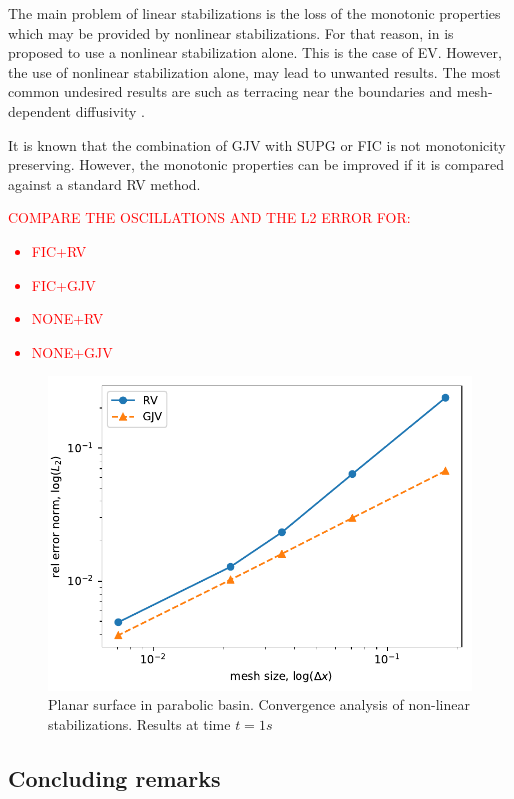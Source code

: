 The main problem of linear stabilizations is the loss of the monotonic properties which may be provided by nonlinear stabilizations. For that reason, in \cite{guermond2011} is proposed to use a nonlinear stabilization alone. This is the case of EV.
However, the use of nonlinear stabilization alone, may lead to unwanted results. The most common undesired results are such as terracing near the boundaries \cite{lohner2008ch9,kuzmin2005b} and mesh-dependent diffusivity \cite{badia2014}.

It is known that the combination of GJV with SUPG or FIC is not monotonicity preserving. However, the monotonic properties can be improved if it is compared against a standard RV method.




\textcolor{red}{COMPARE THE OSCILLATIONS AND THE L2 ERROR FOR:
\begin{itemize}
\item FIC+RV
\item FIC+GJV
\item NONE+RV
\item NONE+GJV
\end{itemize}
}


\begin{figure}
    \centering
    \includegraphics[width=.7\textwidth]{img/eulerian/gjv/gjv_rv_parabola_convergence.pdf}
    \caption{Planar surface in parabolic basin. Convergence analysis of non-linear stabilizations. Results at time $t=1s$}
    \label{gjv_rv_parabola_converence}
\end{figure}



\subsection{Concluding remarks}





